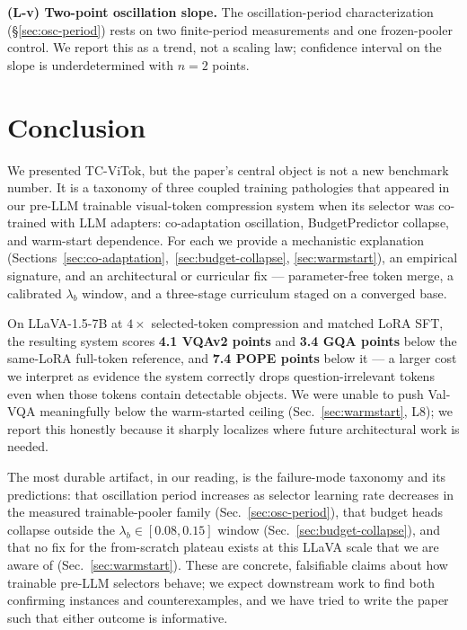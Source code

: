 \documentclass{article}
\begin{document}
\textbf{(L-v) Two-point oscillation slope.}
The oscillation-period characterization (\S\ref{sec:osc-period}) rests on two
finite-period measurements and one frozen-pooler control. We report this as a
trend, not a scaling law; confidence interval on the slope is underdetermined
with $n{=}2$ points.

\section{Conclusion}
\label{sec:conclusion}

We presented TC-ViTok, but the paper's central object is not a new
benchmark number. It is a taxonomy of three coupled training
pathologies that appeared in our pre-LLM trainable visual-token compression
system when its selector was co-trained with LLM adapters: co-adaptation
oscillation, BudgetPredictor collapse, and
warm-start dependence. For each we provide a mechanistic explanation
(Sections~\ref{sec:co-adaptation},~\ref{sec:budget-collapse},
\ref{sec:warmstart}), an empirical signature, and an architectural or
curricular fix --- parameter-free token merge, a calibrated $\lambda_b$
window, and a three-stage curriculum staged on a converged base.

On LLaVA-1.5-7B at $4{\times}$ selected-token compression and matched LoRA SFT,
the resulting system scores \textbf{4.1 VQAv2 points} and
\textbf{3.4 GQA points} below the same-LoRA full-token reference,
and \textbf{7.4 POPE points} below it --- a larger cost we interpret
as evidence the system correctly drops question-irrelevant tokens
even when those tokens contain detectable objects. We were unable to
push Val-VQA meaningfully below the warm-started ceiling
(Sec.~\ref{sec:warmstart}, L8); we report this honestly because it
sharply localizes where future architectural work is needed.

The most durable artifact, in our reading, is the failure-mode
taxonomy and its predictions: that oscillation period increases as selector
learning rate decreases in the measured trainable-pooler family
(Sec.~\ref{sec:osc-period}), that budget heads
collapse outside the $\lambda_b \in [0.08, 0.15]$ window
(Sec.~\ref{sec:budget-collapse}), and that no fix for the from-scratch
plateau exists at this LLaVA scale that we are aware of
(Sec.~\ref{sec:warmstart}). These are concrete, falsifiable claims
about how trainable pre-LLM selectors behave; we expect downstream
work to find both confirming instances and counterexamples, and we
have tried to write the paper such that either outcome is informative.
\end{document}
